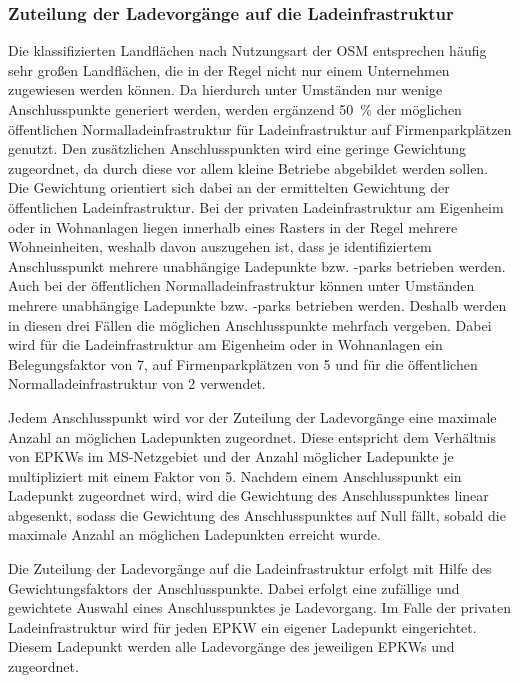 \subsubsection{Zuteilung der Ladevorgänge auf die Ladeinfrastruktur}

Die klassifizierten Landflächen nach Nutzungsart der \gls{OSM} entsprechen häufig sehr großen Landflächen, die in der Regel nicht nur einem Unternehmen zugewiesen werden können.
Da hierdurch unter Umständen nur wenige Anschlusspunkte generiert werden, werden ergänzend \SI{50}{\percent} der möglichen öffentlichen Normalladeinfrastruktur für Ladeinfrastruktur auf Firmenparkplätzen genutzt.
Den zusätzlichen Anschlusspunkten wird eine geringe Gewichtung zugeordnet, da durch diese vor allem kleine Betriebe abgebildet werden sollen.
Die Gewichtung orientiert sich dabei an der ermittelten Gewichtung der öffentlichen Ladeinfrastruktur.
Bei der privaten Ladeinfrastruktur am Eigenheim oder in Wohnanlagen liegen innerhalb eines Rasters in der Regel mehrere Wohneinheiten, weshalb davon auszugehen ist, dass je identifiziertem Anschlusspunkt mehrere unabhängige Ladepunkte bzw. -parks betrieben werden.
Auch bei der öffentlichen Normalladeinfrastruktur können unter Umständen mehrere unabhängige Ladepunkte bzw. -parks betrieben werden.
Deshalb werden in diesen drei Fällen die möglichen Anschlusspunkte mehrfach vergeben.
Dabei wird für die Ladeinfrastruktur am Eigenheim oder in Wohnanlagen ein Belegungsfaktor von \num{7}, auf Firmenparkplätzen von \num{5} und für die öffentlichen Normalladeinfrastruktur von \num{2} verwendet.\medskip

Jedem Anschlusspunkt wird vor der Zuteilung der Ladevorgänge eine maximale Anzahl an möglichen Ladepunkten zugeordnet.
Diese entspricht dem Verhältnis von \glspl{EPKW} im \gls{MS}-Netzgebiet und der Anzahl möglicher Ladepunkte je \UC multipliziert mit einem Faktor von \num{5}.
Nachdem einem Anschlusspunkt ein Ladepunkt zugeordnet wird, wird die Gewichtung des Anschlusspunktes linear abgesenkt, sodass die Gewichtung des Anschlusspunktes auf Null fällt, sobald die maximale Anzahl an möglichen Ladepunkten erreicht wurde.\medskip

Die Zuteilung der Ladevorgänge auf die Ladeinfrastruktur erfolgt mit Hilfe des Gewichtungsfaktors der Anschlusspunkte.
Dabei erfolgt eine zufällige und gewichtete Auswahl eines Anschlusspunktes je Ladevorgang.
Im Falle der privaten Ladeinfrastruktur wird für jeden \gls{EPKW} ein eigener Ladepunkt eingerichtet.
Diesem Ladepunkt werden alle Ladevorgänge des jeweiligen \glspl{EPKW} und \UC zugeordnet.\medskip

